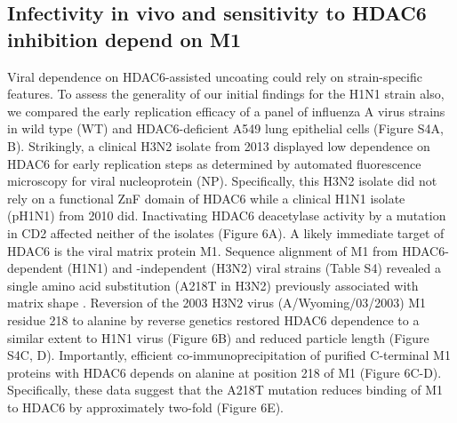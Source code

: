 \subsection{Infectivity in vivo and sensitivity to HDAC6 inhibition depend on M1}

Viral dependence on HDAC6-assisted uncoating could rely on strain-specific features. To assess the generality of our initial findings for the H1N1 strain also, we compared the early replication efficacy of a panel of influenza A virus strains in wild type (WT) and HDAC6-deficient A549 lung epithelial cells (Figure S4A, B). Strikingly, a clinical H3N2 isolate from 2013 displayed low dependence on HDAC6 for early replication steps as determined by automated fluorescence microscopy for viral nucleoprotein (NP). Specifically, this H3N2 isolate did not rely on a functional ZnF domain of HDAC6 while a clinical H1N1 isolate (pH1N1) from 2010 did. Inactivating HDAC6 deacetylase activity by a mutation in CD2 affected neither of the isolates (Figure 6A). A likely immediate target of HDAC6 is the viral matrix protein M1. Sequence alignment of M1 from HDAC6-dependent (H1N1) and -independent (H3N2) viral strains (Table S4) revealed a single amino acid substitution (A218T in H3N2) previously associated with matrix shape \cite{elleman2004m1}. Reversion of the 2003 H3N2 virus (A/Wyoming/03/2003) M1 residue 218 to alanine by reverse genetics restored HDAC6 dependence to a similar extent to H1N1 virus (Figure 6B) and reduced particle length (Figure S4C, D). Importantly, efficient co-immunoprecipitation of purified C-terminal M1 proteins with HDAC6 depends on alanine at position 218 of M1 (Figure 6C-D). Specifically, these data suggest that the A218T mutation reduces binding of M1 to HDAC6 by approximately two-fold (Figure 6E).

